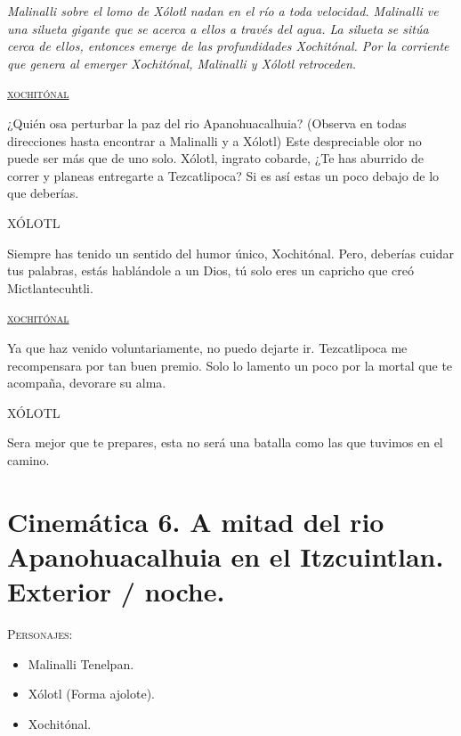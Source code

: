 \documentclass[11pt,letterpaper]{article}
\begin{document}
\textit{Malinalli sobre el lomo de Xólotl nadan en el río a toda velocidad. Malinalli ve una silueta gigante que se acerca a ellos a través del agua. La silueta se sitúa cerca de ellos, entonces emerge de las profundidades Xochitónal. Por la corriente que genera al emerger Xochitónal, Malinalli y Xólotl retroceden.}

\begin{center}
\textsc{\underline{xochitónal}}
\\
\par
¿Quién osa perturbar la paz del rio Apanohuacalhuia? (Observa en todas direcciones hasta encontrar a Malinalli y a Xólotl) Este despreciable olor no puede ser más que de uno solo. Xólotl, ingrato cobarde, ¿Te has aburrido de correr y planeas entregarte a Tezcatlipoca? Si es así estas un poco debajo de lo que deberías.
\\
\par
XÓLOTL
\\
\par
Siempre has tenido un sentido del humor único, Xochitónal. Pero, deberías cuidar tus palabras, estás hablándole a un Dios, tú solo eres un capricho que creó Mictlantecuhtli.
\\
\par
\textsc{\underline{xochitónal}}
\\
\par
Ya que haz venido voluntariamente, no puedo dejarte ir. Tezcatlipoca me recompensara por tan buen premio. Solo lo lamento un poco por la mortal que te acompaña, devorare su alma.
\\
\par
XÓLOTL
\\
\par
Sera mejor que te prepares, esta no será una batalla como las que tuvimos en el camino.
\end{center}

\section{Cinemática 6. A mitad del rio Apanohuacalhuia en el Itzcuintlan.  Exterior / noche.}
 \textsc{Personajes}:

\begin{itemize}
	\item Malinalli Tenelpan.
	\item Xólotl (Forma ajolote).
	\item Xochitónal.
\end{itemize}
\end{document}
